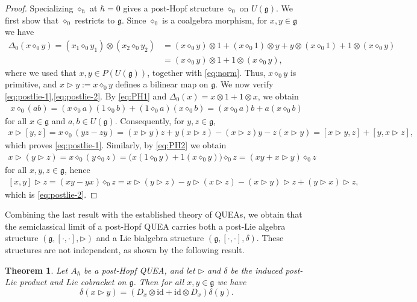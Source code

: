 \documentclass[11pt,english]{article}
\newcommand{\id}{\mathrm{id}}
\newcommand{\Del}{\Delta}
\newcommand{\act}{\mathbin{\diamond}}
\newcommand{\tri}{\mathbin{\triangleright}}
\newtheorem{theorem}[lemma]{Theorem}
\theoremstyle{definition}
\begin{document}
\begin{proof}
Specializing $\act_\hbar$ at $\hbar=0$
gives a post-Hopf structure $\act_0$ on
$U(\mathfrak g)$.
We first show that $\act_0$ restricts
to $\mathfrak g$. Since $\act_0$ is a coalgebra
morphism, for $x,y\in\mathfrak g$ we have
\[
\begin{aligned}
\Del_0(x\act_0 y)
=(x_1\act_0 y_1)\otimes
  (x_2\act_0 y_2)&=(x\act_0 y)\otimes1
 +(x\act_0 1)\otimes y
 +y\otimes(x\act_0 1)
 +1\otimes(x\act_0 y)\\
 &=(x\act_0 y)\otimes1
 +1\otimes(x\act_0 y),
\end{aligned}
\]
where we used that $x,y \in P(U(\mathfrak{g}))$,
together with \eqref{eq:norm}.
Thus, $x\act_0 y$ is primitive, and $x\tri y:=x\act_0 y$
defines a bilinear map on $\mathfrak g$.
We now verify \eqref{eq:postlie-1},\eqref{eq:postlie-2}.
By \eqref{eq:PH1}
and $\Del_0(x)=x\otimes1+1\otimes x$,
we obtain
\[
\begin{aligned}
x\act_0(ab)
=(x\act_0 a)(1\act_0 b)
 +(1\act_0 a)(x\act_0 b)=(x\act_0 a)b+a(x\act_0 b)
\end{aligned}
\]
for all $x\in\mathfrak g$ and
$a,b\in U(\mathfrak g)$. Consequently, for $y,z\in\mathfrak g$,
\[
\begin{aligned}
x\tri[y,z]
=x\act_0(yz-zy)=(x\tri y)z+y(x\tri z)
 -(x\tri z)y-z(x\tri y)=[x\tri y,z]+[y,x\tri z],
\end{aligned}
\]
which proves \eqref{eq:postlie-1}.
Similarly, by \eqref{eq:PH2}
we obtain
\[
\begin{aligned}
x\tri(y\tri z)
=x\act_0(y\act_0 z)=\bigl(x(1\act_0 y)
       +1(x\act_0 y)\bigr)\act_0 z=(xy+x\tri y)\act_0 z
\end{aligned}
\]
for all $x,y,z \in \mathfrak{g}$, hence
\[
\begin{aligned}
[x,y]\tri z
=(xy-yx)\act_0 z=x\tri(y\tri z)-y\tri(x\tri z) -(x\tri y)\tri z
 +(y\tri x)\tri z,
\end{aligned}
\]
which is \eqref{eq:postlie-2}.
\end{proof}
Combining the last result with the established theory of QUEAs, we obtain that the semiclassical limit of a post-Hopf QUEA
carries both a post-Lie algebra structure
$(\mathfrak g,[\cdot,\cdot],\tri)$ and a Lie
bialgebra structure
$(\mathfrak g,[\cdot,\cdot],\delta)$.
These structures are not independent, as shown
by the following result.

\begin{theorem}\label{thm:semiclassical-compatibility}
Let $A_\hbar$ be a post-Hopf QUEA, and let
$\tri$ and $\delta$ be the induced post-Lie product
and Lie cobracket on $\mathfrak g$. Then for all $x,y\in\mathfrak g$ we have
\begin{equation}\label{eq:postlie-compatibility}
\delta(x\tri y)
=(D_x\otimes\id+\id\otimes D_x)\delta(y).
\end{equation}
\end{theorem}
\end{document}
